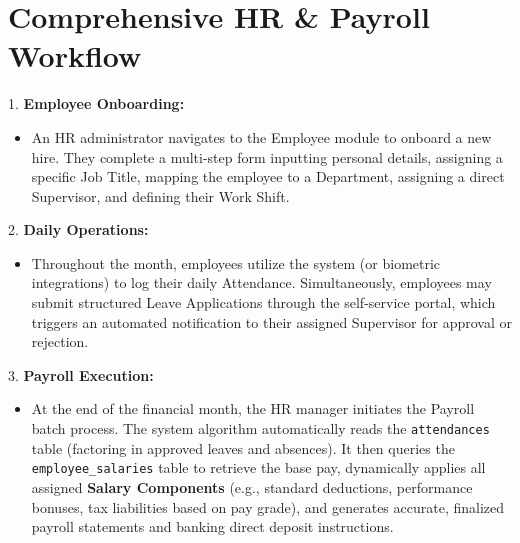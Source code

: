 ﻿\documentclass[12pt,a4paper]{report}
\begin{document}
\section*{Comprehensive HR \& Payroll Workflow}
1. \textbf{Employee Onboarding:}
    \begin{itemize}
        \item An HR administrator navigates to the Employee module to onboard a new hire. They complete a multi-step form inputting personal details, assigning a specific Job Title, mapping the employee to a Department, assigning a direct Supervisor, and defining their Work Shift.
    \end{itemize}
2. \textbf{Daily Operations:}
    \begin{itemize}
        \item Throughout the month, employees utilize the system (or biometric integrations) to log their daily Attendance. Simultaneously, employees may submit structured Leave Applications through the self-service portal, which triggers an automated notification to their assigned Supervisor for approval or rejection.
    \end{itemize}
3. \textbf{Payroll Execution:}
    \begin{itemize}
        \item At the end of the financial month, the HR manager initiates the Payroll batch process. The system algorithm automatically reads the \texttt{attendances} table (factoring in approved leaves and absences). It then queries the \texttt{employee\_salaries} table to retrieve the base pay, dynamically applies all assigned \textbf{Salary Components} (e.g., standard deductions, performance bonuses, tax liabilities based on pay grade), and generates accurate, finalized payroll statements and banking direct deposit instructions.
    \end{itemize}
\end{document}

